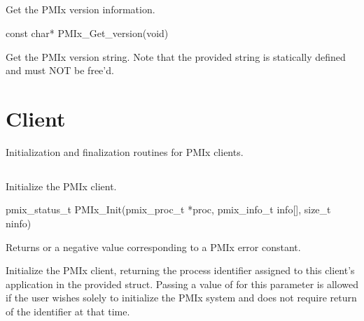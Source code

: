 \subsection{}

\summary

Get the PMIx version information.

\format

\cspecificstart
\begin{codepar}
const char* PMIx_Get_version(void)
\end{codepar}
\cspecificend

\descr

Get the \ac{PMIx} version string.
Note that the provided string is statically defined and must NOT be free'd.

\section{Client}
\label{chap:api_init:client}

Initialization and finalization routines for \ac{PMIx} clients.

\subsection{}

\summary

Initialize the \ac{PMIx} client.

\format

\cspecificstart
\begin{codepar}
pmix_status_t
PMIx_Init(pmix_proc_t *proc,
          pmix_info_t info[], size_t ninfo)
\end{codepar}
\cspecificend

\begin{arglist}
\end{arglist}

Returns  or a negative value corresponding to a \ac{PMIx} error constant.

\descr

Initialize the PMIx client, returning the process identifier assigned to this client's application in the provided  struct.
Passing a value of  for this parameter is allowed if the user wishes solely to initialize the PMIx system and does not require return of the identifier at that time.

